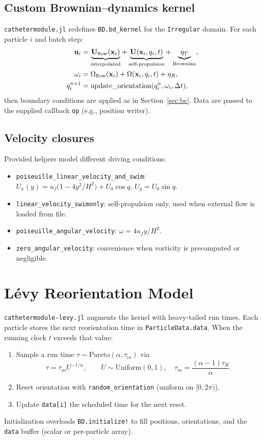 \documentclass[11pt]{article}
\begin{document}
\subsection{Custom Brownian--dynamics kernel}
\texttt{cathetermodule.jl} redefines \texttt{BD.bd\_kernel} for the \texttt{Irregular} domain. For each particle $i$ and batch step:
\begin{align}
  \vb{u}_i &= \underbrace{\vb{U}_{\text{flow}}(\vb{x}_i)}_{\text{interpolated}} + \underbrace{\vb{U}(\vb{x}_i,q_i,t)}_{\text{self-propulsion}} + \underbrace{\vb{\eta}_T}_{\text{Brownian}},\\
  \omega_i &= \Omega_{\text{flow}}(\vb{x}_i) + \Omega(\vb{x}_i,q_i,t) + \eta_R,\\
  q_i^{n+1} &= \mathrm{update\_orientation}(q_i^{n},\omega_i,\Delta t),
\end{align}
then boundary conditions are applied as in Section~\ref{sec:bc}. Data are passed to the supplied callback \texttt{op} (e.g., position writer).

\subsection{Velocity closures}
Provided helpers model different driving conditions:
\begin{itemize}[leftmargin=*]
  \item \texttt{poiseuille\_linear\_velocity\_and\_swim}: $U_x(y)=u_f\bigl(1-4y^2/H^2\bigr) + U_0 \cos q$, $U_y=U_0 \sin q$.
  \item \texttt{linear\_velocity\_swimonly}: self-propulsion only, used when external flow is loaded from file.
  \item \texttt{poiseuille\_angular\_velocity}: $\omega = 4u_f y/H^2$.
  \item \texttt{zero\_angular\_velocity}: convenience when vorticity is precomputed or negligible.
\end{itemize}

\section{L\'evy Reorientation Model}
\label{sec:levy}
\texttt{cathetermodule-levy.jl} augments the kernel with heavy-tailed run times. Each particle stores the next reorientation time in \texttt{ParticleData.data}. When the running clock $t$ exceeds that value:
\begin{enumerate}[leftmargin=*]
  \item Sample a run time $\tau \sim \text{Pareto}(\alpha,\tau_m)$ via
  \begin{equation}
    \tau = \tau_m U^{-1/\alpha}, \qquad U\sim \mathrm{Uniform}(0,1),\quad \tau_m = \frac{(\alpha-1)\tau_R}{\alpha}.
  \end{equation}
  \item Reset orientation with \texttt{random\_orientation} (uniform on $[0,2\pi)$).
  \item Update \texttt{data[i]} \textendash{} the scheduled time for the next reset.
\end{enumerate}
Initialization overloads \texttt{BD.initialize!} to fill positions, orientations, and the \texttt{data} buffer (scalar or per-particle array).
\end{document}
